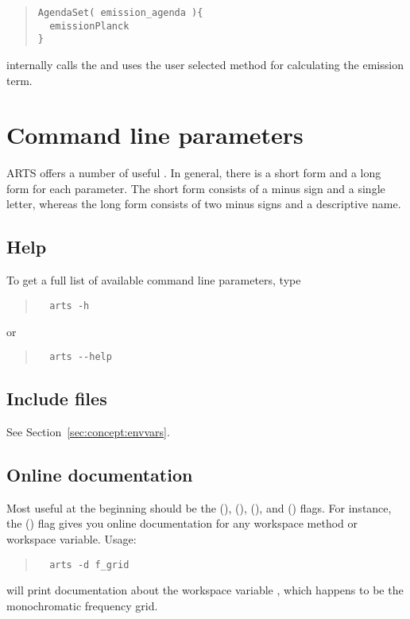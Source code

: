 \begin{quote}
\begin{verbatim}
AgendaSet( emission_agenda ){
  emissionPlanck
}
\end{verbatim}
\end{quote}

\noindent
{} internally calls the  and
uses the user selected method for calculating the emission term.


\section{Command line parameters}
\label{sec:concept:comline}

ARTS offers a number of useful . In
general, there is a short form and a long form for each parameter. The
short form consists of a minus sign and a single letter, whereas the
long form consists of two minus signs and a descriptive name.

\subsection*{Help}

To get a full list of available command line parameters, type
\begin{quote}
\begin{verbatim}
  arts -h
\end{verbatim}
\end{quote}
or
\begin{quote}
\begin{verbatim}
  arts --help
\end{verbatim}
\end{quote}


\subsection*{Include files}

See Section~\ref{sec:concept:envvars}.


\subsection*{Online documentation}

Most useful at the beginning should be the 
(),  (), 
(), and  () flags.
For instance, the  () flag gives you online
documentation for any workspace method or workspace variable. Usage:
\begin{quote}
\begin{verbatim}
  arts -d f_grid
\end{verbatim}
\end{quote}
will print documentation about the workspace variable , which
happens to be the monochromatic frequency grid.

